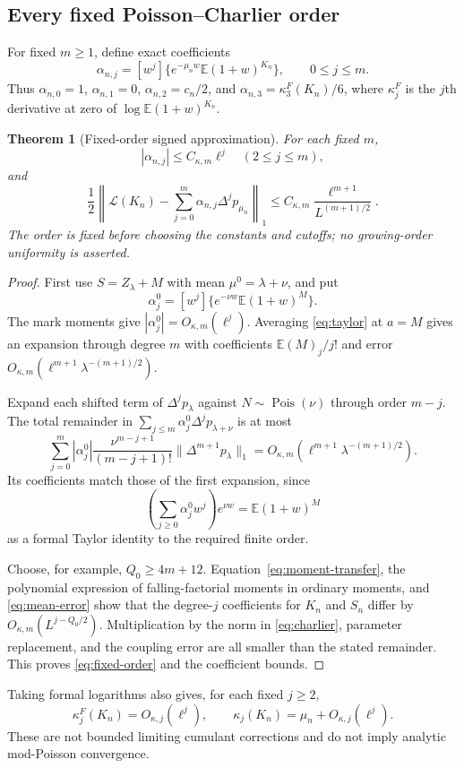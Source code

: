 \documentclass[11pt]{article}
\newcommand{\E}{\mathbb E}
\newcommand{\Pois}{\operatorname{Pois}}
\newcommand{\Law}{\mathcal L}
\newtheorem{theorem}{Theorem}[section]
\theoremstyle{remark}
\begin{document}
\subsection{Every fixed Poisson--Charlier order}
For fixed $m\ge1$, define exact coefficients
\begin{equation}\label{eq:coefficients}
 \alpha_{n,j}=[w^j]\{e^{-\mu_n w}\E(1+w)^{K_n}\},\qquad 0\le j\le m.
\end{equation}
Thus $\alpha_{n,0}=1$, $\alpha_{n,1}=0$, $\alpha_{n,2}=c_n/2$, and $\alpha_{n,3}=\kappa_3^F(K_n)/6$, where $\kappa_j^F$ is the $j$th derivative at zero of $\log\E(1+w)^{K_n}$.
\begin{theorem}[Fixed-order signed approximation]\label{thm:fixed-order}
For each fixed $m$,
\[
 |\alpha_{n,j}|\le C_{\kappa,m}\ell^j\quad(2\le j\le m),
\]
and
\begin{equation}\label{eq:fixed-order}
 \frac12\left\|\Law(K_n)-\sum_{j=0}^m\alpha_{n,j}\Delta^jp_{\mu_n}\right\|_1
 \le C_{\kappa,m}\frac{\ell^{m+1}}{L^{(m+1)/2}}.
\end{equation}
The order is fixed before choosing the constants and cutoffs; no growing-order uniformity is asserted.
\end{theorem}
\begin{proof}
First use $S=Z_\lambda+M$ with mean $\mu^0=\lambda+\nu$, and put
\[
 \alpha_j^0=[w^j]\{e^{-\nu w}\E(1+w)^M\}.
\]
The mark moments give $|\alpha_j^0|=O_{\kappa,m}(\ell^j)$. Averaging \eqref{eq:taylor} at $a=M$ gives an expansion through degree $m$ with coefficients $\E(M)_j/j!$ and error $O_{\kappa,m}(\ell^{m+1}\lambda^{-(m+1)/2})$.

Expand each shifted term of $\Delta^jp_\lambda$ against $N\sim\Pois(\nu)$ through order $m-j$. The total remainder in $\sum_{j\le m}\alpha_j^0\Delta^jp_{\lambda+\nu}$ is at most
\[
 \sum_{j=0}^m|\alpha_j^0|\frac{\nu^{m-j+1}}{(m-j+1)!}
 \|\Delta^{m+1}p_\lambda\|_1
 =O_{\kappa,m}(\ell^{m+1}\lambda^{-(m+1)/2}).
\]
Its coefficients match those of the first expansion, since
\[
 \left(\sum_{j\ge0}\alpha_j^0w^j\right)e^{\nu w}=\E(1+w)^M
\]
as a formal Taylor identity to the required finite order.

Choose, for example, $Q_0\ge4m+12$. Equation~\eqref{eq:moment-transfer}, the polynomial expression of falling-factorial moments in ordinary moments, and \eqref{eq:mean-error} show that the degree-$j$ coefficients for $K_n$ and $S_n$ differ by $O_{\kappa,m}(L^{j-Q_0/2})$. Multiplication by the norm in \eqref{eq:charlier}, parameter replacement, and the coupling error are all smaller than the stated remainder. This proves \eqref{eq:fixed-order} and the coefficient bounds.
\end{proof}
Taking formal logarithms also gives, for each fixed $j\ge2$,
\[
 \kappa_j^F(K_n)=O_{\kappa,j}(\ell^j),\qquad
 \kappa_j(K_n)=\mu_n+O_{\kappa,j}(\ell^j).
\]
These are not bounded limiting cumulant corrections and do not imply analytic mod-Poisson convergence.
\end{document}
